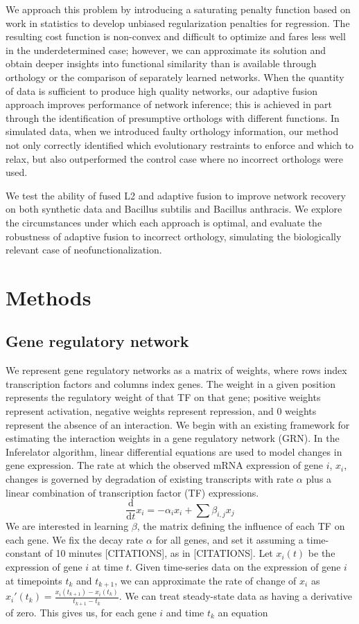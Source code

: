 \documentclass[11pt]{article}
\begin{document}
We approach this problem by introducing a saturating penalty function based on work in statistics to develop unbiased regularization penalties for regression. The resulting cost function is non-convex and difficult to optimize and fares less well in the underdetermined case; however, we can approximate its solution and obtain deeper insights into functional similarity than is available through orthology or the comparison of separately learned networks. When the quantity of data is sufficient to produce high quality networks, our adaptive fusion approach improves performance of network inference; this is achieved in part through the identification of presumptive orthologs with different functions. In simulated data, when we introduced faulty orthology information, our method not only correctly identified which evolutionary restraints to enforce and which to relax, but also outperformed the control case where no incorrect orthologs were used. 

We test the ability of fused L2 and adaptive fusion to improve network recovery on both synthetic data and Bacillus subtilis and Bacillus anthracis. We explore the circumstances under which each approach is optimal, and evaluate the robustness of adaptive fusion to incorrect orthology, simulating the biologically relevant case of neofunctionalization. 

\section{Methods}
\subsection{Gene regulatory network}
We represent gene regulatory networks as a matrix of weights, where rows index transcription factors and columns index genes. The weight in a given position represents the regulatory weight of that TF on that gene; positive weights represent activation, negative weights represent repression, and 0 weights represent the absence of an interaction. We begin with an existing framework for estimating the interaction weights in a gene regulatory network (GRN). In the Inferelator algorithm, linear differential equations are used to model changes in gene expression. The rate at which the observed mRNA expression of gene $i$, $x_i$, changes is governed by degradation of existing transcripts with rate $\alpha$ plus a linear combination of transcription factor (TF) expressions. 
\begin{equation}
\frac{\mathrm d}{\mathrm d t} x_i = -\alpha_{i}x_{i} + \sum \beta_{i,j}x_{j}
\end{equation}
We are interested in learning $\beta$, the matrix defining the influence of each TF on each gene. We fix the decay rate $\alpha$ for all genes, and set it assuming a time-constant of 10 minutes [CITATIONS], as in [CITATIONS]. Let $x_i(t)$ be the expression of gene $i$ at time $t$. Given time-series data on the expression of gene $i$ at timepoints $t_k$ and $t_{k+1}$, we can approximate the rate of change of $x_i$ as $x_i'(t_k)=\frac{x_i(t_{k+1})-x_i(t_k)}{t_{k+1}-t_k}$. We can treat steady-state data as having a derivative of zero. This gives us, for each gene $i$ and time $t_{k}$ an equation
\end{document}

